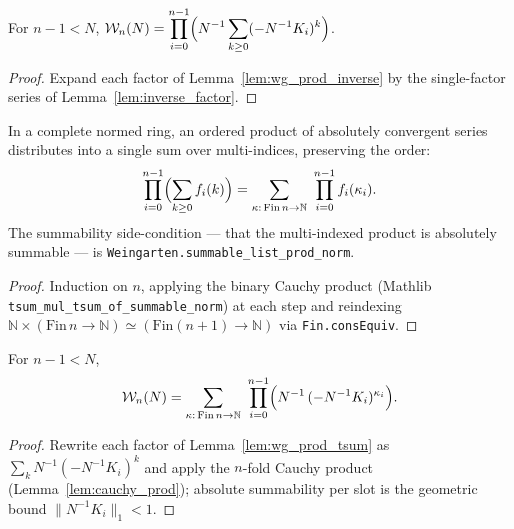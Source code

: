 \begin{lemma}\label{lem:wg_prod_tsum}
\leanok
{}
For $n-1<N$,
$\displaystyle \mathcal W_n(N)=\prod_{i=0}^{n-1}\Bigl(N^{-1}\sum_{k\ge0}(-N^{-1}K_i)^k\Bigr)$.
\end{lemma}
\begin{proof}\leanok{}
Expand each factor of Lemma~\ref{lem:wg_prod_inverse} by the single-factor
series of Lemma~\ref{lem:inverse_factor}.
\end{proof}

\begin{lemma}\label{lem:cauchy_prod}
\leanok
In a complete normed ring, an ordered product of absolutely convergent series
distributes into a single sum over multi-indices, preserving the order:
\[
\prod_{i=0}^{n-1}\Bigl(\sum_{k\ge0}f_i(k)\Bigr)
=\sum_{\kappa:\,\mathrm{Fin}\,n\to\mathbb N}\ \prod_{i=0}^{n-1}f_i(\kappa_i).
\]
The summability side-condition --- that the multi-indexed product is absolutely
summable --- is \texttt{Weingarten.summable\_list\_prod\_norm}.
\end{lemma}
\begin{proof}\leanok
Induction on $n$, applying the binary Cauchy product (Mathlib
\texttt{tsum\_mul\_tsum\_of\_summable\_norm}) at each step and reindexing
$\mathbb N\times(\mathrm{Fin}\,n\to\mathbb N)\simeq(\mathrm{Fin}(n{+}1)\to\mathbb N)$
via \texttt{Fin.consEquiv}.
\end{proof}

\begin{lemma}\label{lem:wg_multiindex}
\leanok
{}
For $n-1<N$,
\[
\mathcal W_n(N)
=\sum_{\kappa:\,\mathrm{Fin}\,n\to\mathbb N}\
\prod_{i=0}^{n-1}\Bigl(N^{-1}\,(-N^{-1}K_i)^{\kappa_i}\Bigr).
\]
\end{lemma}
\begin{proof}\leanok{}
Rewrite each factor of Lemma~\ref{lem:wg_prod_tsum} as
$\sum_k N^{-1}(-N^{-1}K_i)^k$ and apply the $n$-fold Cauchy product
(Lemma~\ref{lem:cauchy_prod}); absolute summability per slot is the geometric
bound $\|N^{-1}K_i\|_1<1$.
\end{proof}

